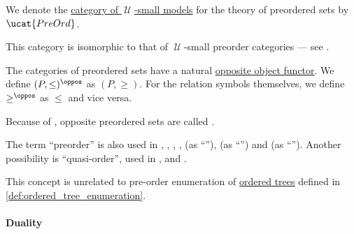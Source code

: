 \begin{definition}
\begin{thmenum}[resume=def:preordered_set]
      We denote the \hyperref[def:fol_theory_model_functor/obj]{category of \( \mscrU \)-small models} for the theory of preordered sets by \( \ucat{PreOrd} \).

    This category is isomorphic to that of \( \mscrU \)-small preorder categories --- see .

     The categories of preordered sets have a natural \hyperref[con:opposite_object]{opposite object functor}. We define \( (P, \leq)^{\oppos} \) as \( (P, \geq) \). For the relation symbols themselves, we define \( \geq^{\oppos} \) as \( \leq \) and vice versa.

    Because of , opposite preordered sets are called .
  \end{thmenum}
\end{definition}
\begin{comments}
  \item The term \enquote{preorder} is also used in
  \cite[133]{Bourbaki2004TheoryOfSets},
  \cite[3]{Grätzer2011LatticeTheory},
  \cite[\S 5.4.2]{Mimram2020ProgramEqualsProof},
  \cite[example 9.1.14]{UnivalentFoundationsProgram2013HoTT},
  \cite[10]{ЦаленкоШульгейфер1974ОсновыТеорииКатегорий} (as \enquote{}),
  \cite[def. 3.1]{Гуров2013ТеорияРешёток} (as \enquote{}) and
  \cite[66]{БелоусовТкачёв2004ДискретнаяМатематика} (as \enquote{}). Another possibility is \enquote{quasi-order}, used in
  \cite[20]{Birkhoff1967LatticeTheory},
  \cite[\S 3.1]{Harzheim2005OrderedSets} and
  \cite[445]{Rotman2015AdvancedModernAlgebraPart1}.

  \item This concept is unrelated to pre-order enumeration of \hyperref[def:ordered_tree]{ordered trees} defined in \cref{def:ordered_tree_enumeration}.
\end{comments}

\paragraph{Duality}

